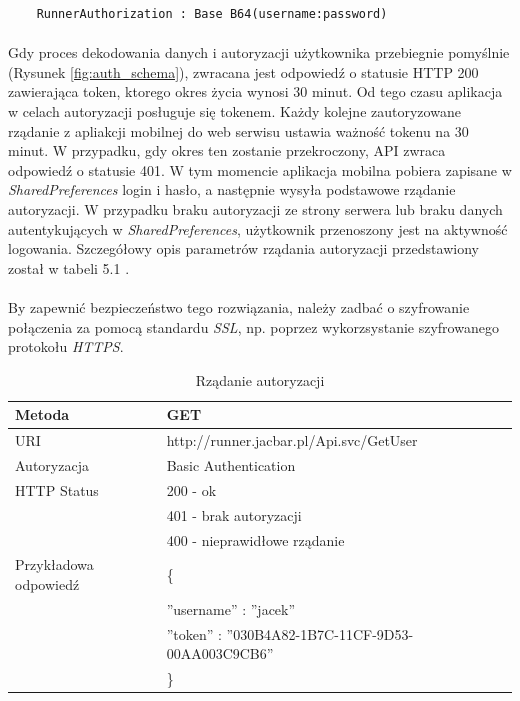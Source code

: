 
\begin{lstlisting}
	RunnerAuthorization : Base B64(username:password)
\end{lstlisting}

\paragraph{} %
\label{par:}
Gdy proces dekodowania danych i autoryzacji użytkownika przebiegnie pomyślnie (Rysunek \ref{fig:auth_schema}), zwracana jest odpowiedź o statusie HTTP 200 zawierająca token, ktorego okres życia wynosi 30 minut. Od tego czasu aplikacja w celach autoryzacji posługuje się tokenem. Każdy kolejne zautoryzowane rządanie z apliakcji mobilnej do web serwisu ustawia ważność tokenu na 30 minut. W przypadku, gdy okres ten zostanie przekroczony, API zwraca odpowiedź o statusie 401. W tym momencie aplikacja mobilna pobiera zapisane w \textit{SharedPreferences} login i hasło, a następnie wysyła podstawowe rządanie autoryzacji. W przypadku braku autoryzacji ze strony serwera lub braku danych autentykujących w \textit{SharedPreferences}, użytkownik przenoszony jest na aktywność logowania. Szczegółowy opis parametrów rządania autoryzacji przedstawiony został w tabeli 5.1 .

\paragraph{} %
\label{par:}
By zapewnić bezpieczeństwo tego rozwiązania, należy zadbać o szyfrowanie połączenia za pomocą standardu \textit{SSL}, np. poprzez wykorzsystanie szyfrowanego protokołu \textit{HTTPS}.
\begin{table}
 \label{tab:aut}
  \caption{Rządanie autoryzacji}
  \begin{center}
  \begin{tabular}{| l | l |}
  	\hline
  	Metoda & GET \\ \hline
  	URI & http://runner.jacbar.pl/Api.svc/GetUser \\ \hline
  	Autoryzacja & Basic Authentication \\ \hline
  	HTTP Status & 200 - ok \\
                & 401 - brak autoryzacji \\
                & 400 - nieprawidłowe rządanie \\ \hline
    Przykładowa odpowiedź & \{ \\
                          & \quad ''username'' : ''jacek'' \\
                          & \quad ''token'' : ''030B4A82-1B7C-11CF-9D53-00AA003C9CB6'' \\
                          & \} \\ \hline
  \end{tabular}
  \end{center}
\end{table}

